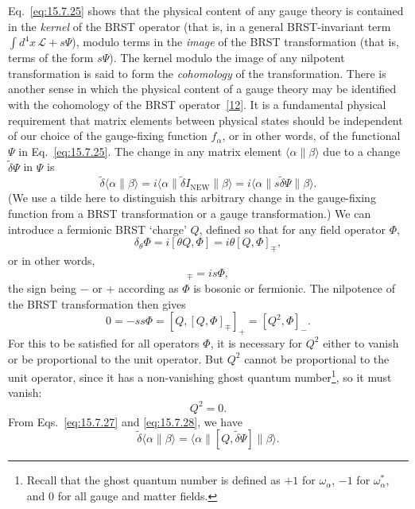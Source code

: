 Eq.~\eqref{eq:15.7.25} shows that the physical content of any gauge theory is contained in the \emph{kernel} of the BRST operator (that is, in a general BRST-invariant term $\int d^4x\,\mathcal L+s\Psi$), modulo terms in the \emph{image} of the BRST transformation (that is, terms of the form $s\Psi$). The kernel modulo the image of any nilpotent transformation is said to form the \emph{cohomology} of the transformation. There is another sense in which the physical content of a gauge theory may be identified with the cohomology of the BRST operator~\hyperref[ch15-ref-12]{[12]}. It is a fundamental physical requirement that matrix elements between physical states should be independent of our choice of the gauge-fixing function $f_\alpha$, or in other words, of the functional $\Psi$ in Eq.~\eqref{eq:15.7.25}. The change in any matrix element $\langle\alpha\|\beta\rangle$ due to a change $\widetilde\delta\Psi$ in $\Psi$ is
\begin{equation}
 \widetilde\delta\langle\alpha\|\beta\rangle
 =i\langle\alpha\|\widetilde\delta I_{\mathrm{NEW}}\|\beta\rangle
 =i\langle\alpha\|s\widetilde\delta\Psi\|\beta\rangle.
 \tag{15.7.27}\label{eq:15.7.27}
\end{equation}
(We use a tilde here to distinguish this arbitrary change in the gauge-fixing function from a BRST transformation or a gauge transformation.) We can introduce a fermionic BRST `charge' $Q$, defined so that for any field operator $\Phi$,
\[
 \delta_\theta\Phi=i[\theta Q,\Phi]=i\theta[Q,\Phi]_{\mp},
\]
or in other words,
\begin{equation}
 [Q,\Phi]_{\mp}=is\Phi,
 \tag{15.7.28}\label{eq:15.7.28}
\end{equation}
the sign being $-$ or $+$ according as $\Phi$ is bosonic or fermionic. The nilpotence of the BRST transformation then gives
\[
 0=-ss\Phi=[Q,[Q,\Phi]_{\mp}]_+=[Q^2,\Phi]_-.
\]
For this to be satisfied for all operators $\Phi$, it is necessary for $Q^2$ either to vanish or be proportional to the unit operator. But $Q^2$ cannot be proportional to the unit operator, since it has a non-vanishing ghost quantum number\footnote{Recall that the ghost quantum number is defined as $+1$ for $\omega_\alpha$, $-1$ for $\omega_\alpha^*$, and 0 for all gauge and matter fields.}, so it must vanish:
\begin{equation}
 Q^2=0.
 \tag{15.7.29}\label{eq:15.7.29}
\end{equation}
From Eqs.~\eqref{eq:15.7.27} and \eqref{eq:15.7.28}, we have
\begin{equation}
 \widetilde\delta\langle\alpha\|\beta\rangle
 =\langle\alpha\|[Q,\widetilde\delta\Psi]\|\beta\rangle.
 \tag{15.7.30}\label{eq:15.7.30}
\end{equation}
